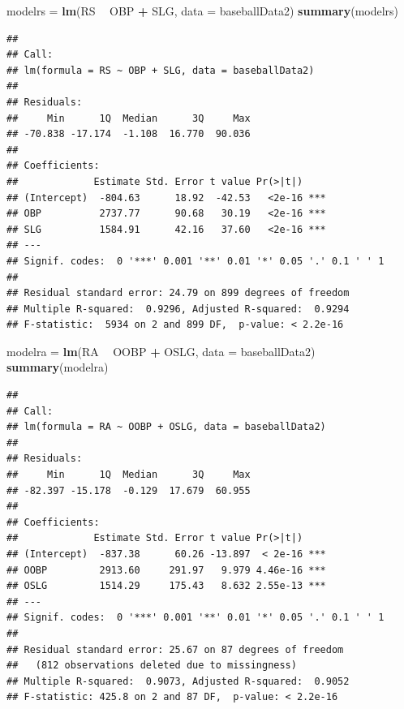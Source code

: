 \documentclass[
]{article}
\newenvironment{Shaded}{\begin{snugshade}}{\end{snugshade}}
\newcommand{\DataTypeTok}[1]{\textcolor[rgb]{0.13,0.29,0.53}{#1}}
\newcommand{\KeywordTok}[1]{\textcolor[rgb]{0.13,0.29,0.53}{\textbf{#1}}}
\newcommand{\NormalTok}[1]{#1}
\newcommand{\OperatorTok}[1]{\textcolor[rgb]{0.81,0.36,0.00}{\textbf{#1}}}
\newcommand{\StringTok}[1]{\textcolor[rgb]{0.31,0.60,0.02}{#1}}
\begin{document}
\begin{Shaded}
\begin{Highlighting}[]
\NormalTok{modelrs =}\StringTok{ }\KeywordTok{lm}\NormalTok{(RS }\OperatorTok{~}\StringTok{ }\NormalTok{OBP }\OperatorTok{+}\StringTok{ }\NormalTok{SLG, }\DataTypeTok{data =}\NormalTok{ baseballData2)}
\KeywordTok{summary}\NormalTok{(modelrs)}
\end{Highlighting}
\end{Shaded}

\begin{verbatim}
## 
## Call:
## lm(formula = RS ~ OBP + SLG, data = baseballData2)
## 
## Residuals:
##     Min      1Q  Median      3Q     Max 
## -70.838 -17.174  -1.108  16.770  90.036 
## 
## Coefficients:
##             Estimate Std. Error t value Pr(>|t|)    
## (Intercept)  -804.63      18.92  -42.53   <2e-16 ***
## OBP          2737.77      90.68   30.19   <2e-16 ***
## SLG          1584.91      42.16   37.60   <2e-16 ***
## ---
## Signif. codes:  0 '***' 0.001 '**' 0.01 '*' 0.05 '.' 0.1 ' ' 1
## 
## Residual standard error: 24.79 on 899 degrees of freedom
## Multiple R-squared:  0.9296, Adjusted R-squared:  0.9294 
## F-statistic:  5934 on 2 and 899 DF,  p-value: < 2.2e-16
\end{verbatim}

\begin{Shaded}
\begin{Highlighting}[]
\NormalTok{modelra =}\StringTok{ }\KeywordTok{lm}\NormalTok{(RA }\OperatorTok{~}\StringTok{ }\NormalTok{OOBP }\OperatorTok{+}\StringTok{ }\NormalTok{OSLG, }\DataTypeTok{data =}\NormalTok{ baseballData2)}
\KeywordTok{summary}\NormalTok{(modelra)}
\end{Highlighting}
\end{Shaded}

\begin{verbatim}
## 
## Call:
## lm(formula = RA ~ OOBP + OSLG, data = baseballData2)
## 
## Residuals:
##     Min      1Q  Median      3Q     Max 
## -82.397 -15.178  -0.129  17.679  60.955 
## 
## Coefficients:
##             Estimate Std. Error t value Pr(>|t|)    
## (Intercept)  -837.38      60.26 -13.897  < 2e-16 ***
## OOBP         2913.60     291.97   9.979 4.46e-16 ***
## OSLG         1514.29     175.43   8.632 2.55e-13 ***
## ---
## Signif. codes:  0 '***' 0.001 '**' 0.01 '*' 0.05 '.' 0.1 ' ' 1
## 
## Residual standard error: 25.67 on 87 degrees of freedom
##   (812 observations deleted due to missingness)
## Multiple R-squared:  0.9073, Adjusted R-squared:  0.9052 
## F-statistic: 425.8 on 2 and 87 DF,  p-value: < 2.2e-16
\end{verbatim}
\end{document}

